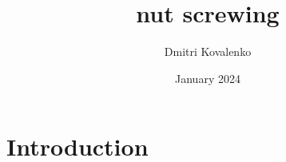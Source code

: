 \documentclass{article}
\title{nut screwing}
\author{Dmitri Kovalenko}
\date{January 2024}
\begin{document}
\maketitle

\section{Introduction}
\end{document}
